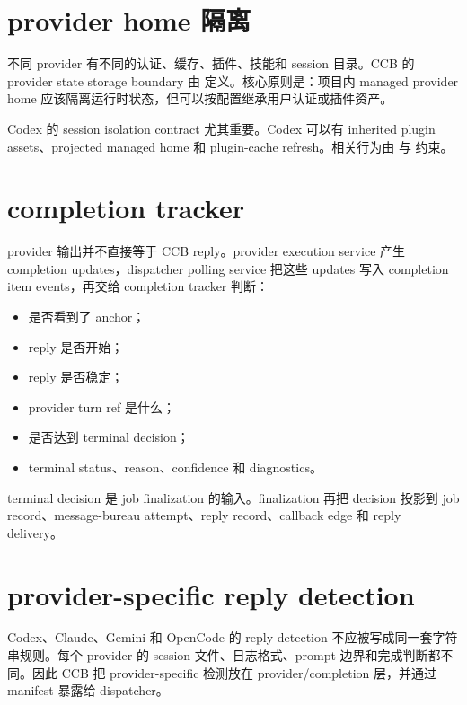 \section{provider home 隔离}

不同 provider 有不同的认证、缓存、插件、技能和 session 目录。CCB 的 provider state storage boundary 由  定义。核心原则是：项目内 managed provider home 应该隔离运行时状态，但可以按配置继承用户认证或插件资产。

Codex 的 session isolation contract 尤其重要。Codex 可以有 inherited plugin assets、projected managed home 和 plugin-cache refresh。相关行为由  与  约束。

\section{completion tracker}

provider 输出并不直接等于 CCB reply。provider execution service 产生 completion updates，dispatcher polling service 把这些 updates 写入 completion item events，再交给 completion tracker 判断：

\begin{itemize}
  \item 是否看到了 anchor；
  \item reply 是否开始；
  \item reply 是否稳定；
  \item provider turn ref 是什么；
  \item 是否达到 terminal decision；
  \item terminal status、reason、confidence 和 diagnostics。
\end{itemize}

terminal decision 是 job finalization 的输入。finalization 再把 decision 投影到 job record、message-bureau attempt、reply record、callback edge 和 reply delivery。

\section{provider-specific reply detection}

Codex、Claude、Gemini 和 OpenCode 的 reply detection 不应被写成同一套字符串规则。每个 provider 的 session 文件、日志格式、prompt 边界和完成判断都不同。因此 CCB 把 provider-specific 检测放在 provider/completion 层，并通过 manifest 暴露给 dispatcher。

